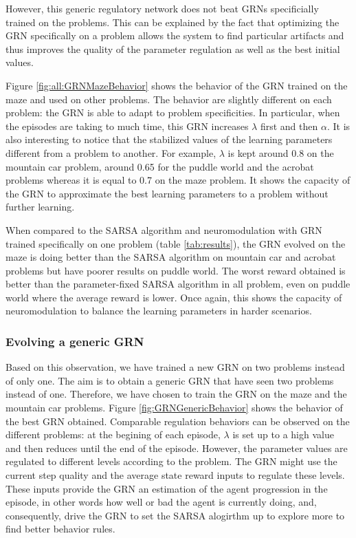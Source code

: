 However, this generic regulatory network does not beat GRNs specificially trained on the problems. This can be explained by the fact that optimizing the GRN specifically on a problem allows the system to find particular artifacts and thus improves the quality of the parameter regulation as well as the best initial values.

Figure \ref{fig:all:GRNMazeBehavior} shows the behavior of the GRN trained on the maze and used on other problems. The behavior are slightly different on each problem: the GRN is able to adapt to problem specificities. In particular, when the episodes are taking to much time, this GRN increases $\lambda$ first and then $\alpha$. It is also interesting to notice that the stabilized values of the learning parameters different from a problem to another. For example, $\lambda$ is kept around 0.8 on the mountain car problem, around 0.65 for the puddle world and the acrobat problems whereas it is equal to 0.7 on the maze problem. It shows the capacity of the GRN to approximate the best learning parameters to a problem without further learning.

When compared to the SARSA algorithm and neuromodulation with GRN trained specifically on one problem (table \ref{tab:results}), the GRN evolved on the maze is doing better than the SARSA algorithm on mountain car and acrobat problems but have poorer results on puddle world. The worst reward obtained is better than the parameter-fixed SARSA algorithm in all problem, even on puddle world where the average reward is lower. Once again, this shows the capacity of neuromodulation to balance the learning parameters in harder scenarios.

\subsubsection{Evolving a generic GRN}
Based on this observation, we have trained a new GRN on two problems instead of only one. The aim is to obtain a generic GRN that have seen two problems instead of one. Therefore, we have chosen to train the GRN on the maze and the mountain car problems. Figure \ref{fig:GRNGenericBehavior} shows the behavior of the best GRN obtained. Comparable regulation behaviors can be observed on the different problems: at the begining of each episode, $\lambda$ is set up to a high value and then reduces until the end of the episode. However, the parameter values are regulated to different levels according to the problem. The GRN might use the current step quality and the average state reward inputs to regulate these levels. These inputs provide the GRN an estimation of the agent progression in the episode, in other words how well or bad the agent is currently doing, and, consequently, drive the GRN to set the SARSA alogirthm up to explore more to find better behavior rules.

